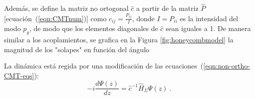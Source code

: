 Además, se define la matriz no ortogonal $\hat{c}$ a partir de la matriz $\hat{P}$ [ecuación~(\ref{eqn:CMTnum})] como $c_{ij} = \frac{P_{ij}}{I}$, donde $I = P_{ii}$ es la intensidad del modo $p_y$, de modo que los elementos diagonales de $\hat{c}$ sean iguales a 1. De manera similar a los acoplamientos, se grafica en la Figura \ref{fig:honeycombmodel} la magnitud de los "solapes" en función del ángulo

La dinámica está regida por una modificación de las ecuaciones~(\ref{eqn:non-ortho-CMT-eqs}):
\begin{equation}
	-i\frac{d \Psi(z)}{dz} = \hat{c}^{-1} \hat{H}_\Sigma \Psi(z) \ .
\end{equation}
